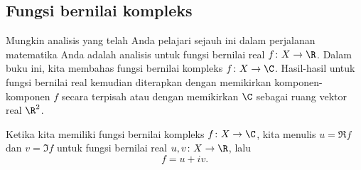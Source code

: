 
\subsection{Fungsi bernilai kompleks}

Mungkin analisis yang telah Anda pelajari sejauh ini dalam perjalanan
matematika Anda adalah analisis untuk fungsi bernilai real $f \colon X \to \R$.
Dalam buku ini, kita membahas fungsi bernilai kompleks $f \colon X \to \C$.
Hasil-hasil untuk fungsi bernilai real kemudian diterapkan dengan memikirkan
komponen-komponen $f$ secara terpisah atau dengan memikirkan $\C$ sebagai ruang
vektor real $\R^2$.

Ketika kita memiliki fungsi bernilai kompleks
$f \colon X \to \C$, kita menulis $u = \Re f$
dan $v = \Im f$ untuk fungsi bernilai real $u,v \colon X \to \R$, lalu
\begin{equation*}
f = u+iv .
\end{equation*}

